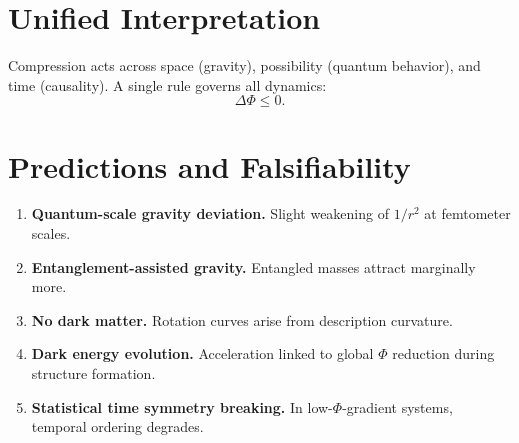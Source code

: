 \documentclass[aps,preprint,onecolumn,longbibliography,nofootinbib]{revtex4-2}
\numberwithin{equation}{section}        %
\begin{document}
\section{Unified Interpretation}
Compression acts across space (gravity), possibility (quantum behavior), and time (causality). A single rule governs all dynamics:
\begin{equation}
\boxed{\Delta \Phi \le 0.} \label{eq:law}
\end{equation}

\section{Predictions and Falsifiability}
\begin{enumerate}
\item \textbf{Quantum-scale gravity deviation.} Slight weakening of $1/r^2$ at femtometer scales.
\item \textbf{Entanglement-assisted gravity.} Entangled masses attract marginally more.
\item \textbf{No dark matter.} Rotation curves arise from description curvature.
\item \textbf{Dark energy evolution.} Acceleration linked to global $\Phi$ reduction during structure formation.
\item \textbf{Statistical time symmetry breaking.} In low-$\Phi$-gradient systems, temporal ordering degrades.
\end{enumerate}

\appendix
\end{document}
